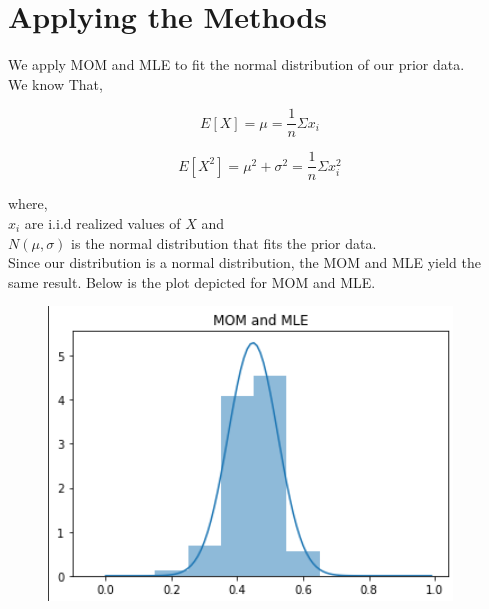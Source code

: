 \documentclass[journal,12pt,twocolumn]{IEEEtran}
\begin{document}
\section{Applying the Methods}
We apply MOM and MLE to fit the normal distribution of our prior data.\\
We know That,

\begin{equation}
    E[X] = \mu = \frac{1}{n}\Sigma x_{i}
\end{equation}

\begin{equation}
    E[X^2] = \mu^2 + \sigma^2 = \frac{1}{n}\Sigma x_{i}^{2}
\end{equation}

where, \\
$x_i$ are i.i.d realized values of $X$ and \\
$N(\mu,\sigma)$ is the normal distribution that fits the prior data.
\\

Since our distribution is a normal distribution, the MOM and MLE yield the same result. Below is the plot depicted for MOM and MLE.
\begin{figure}[!ht]
\centering
\includegraphics[width=\columnwidth]{Images/MOM_MLE.png}
\end{figure}
\end{document}
